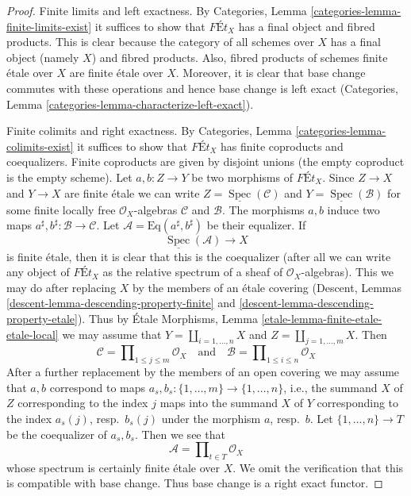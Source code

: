\documentclass{stacks-project}
\theoremstyle{plain}
\theoremstyle{definition}
\theoremstyle{remark}
\numberwithin{equation}{subsection}
\def\Spec{\mathop{\mathrm{Spec}}}
\begin{document}
\begin{proof}
Finite limits and left exactness. By
Categories, Lemma \ref{categories-lemma-finite-limits-exist}
it suffices to show that $\textit{F\'Et}_X$ has a final object
and fibred products. This is clear because the category of
all schemes over $X$ has a final object (namely $X$) and fibred products.
Also, fibred products of schemes finite \'etale over $X$ are
finite \'etale over $X$. Moreover, it is clear that base
change commutes with these operations and hence base change
is left exact (Categories, Lemma
\ref{categories-lemma-characterize-left-exact}).

\medskip\noindent
Finite colimits and right exactness. By
Categories, Lemma \ref{categories-lemma-colimits-exist}
it suffices to show that $\textit{F\'Et}_X$ has finite
coproducts and coequalizers. Finite coproducts are given
by disjoint unions (the empty coproduct is the empty scheme).
Let $a, b : Z \to Y$ be two morphisms of $\textit{F\'Et}_X$.
Since $Z \to X$ and $Y \to X$ are finite \'etale we can write
$Z = \underline{\Spec}(\mathcal{C})$ and $Y = \underline{\Spec}(\mathcal{B})$
for some finite locally free $\mathcal{O}_X$-algebras $\mathcal{C}$
and $\mathcal{B}$. The morphisms $a, b$ induce two maps
$a^\sharp, b^\sharp : \mathcal{B} \to \mathcal{C}$.
Let $\mathcal{A} = \text{Eq}(a^\sharp, b^\sharp)$ be their
equalizer. If
$$
\underline{\Spec}(\mathcal{A}) \longrightarrow X
$$
is finite \'etale, then it is clear that this is the coequalizer
(after all we can write any object of $\textit{F\'Et}_X$
as the relative spectrum of a sheaf of $\mathcal{O}_X$-algebras).
This we may do after replacing $X$ by the members of an \'etale
covering (Descent, Lemmas \ref{descent-lemma-descending-property-finite}
and \ref{descent-lemma-descending-property-etale}).
Thus by \'Etale Morphisms, Lemma \ref{etale-lemma-finite-etale-etale-local}
we may assume that
$Y = \coprod_{i = 1, \ldots, n} X$ and $Z = \coprod_{j = 1, \ldots, m} X$.
Then
$$
\mathcal{C} = \prod\nolimits_{1 \leq j \leq m} \mathcal{O}_X
\quad\text{and}\quad
\mathcal{B} = \prod\nolimits_{1 \leq i \leq n} \mathcal{O}_X
$$
After a further replacement by the members of an open covering
we may assume that $a, b$ correspond to
maps $a_s, b_s : \{1, \ldots, m\} \to \{1, \ldots, n\}$, i.e.,
the summand $X$ of $Z$ corresponding to the index $j$ maps into
the summand $X$ of $Y$ corresponding to the index $a_s(j)$, resp.\ $b_s(j)$
under the morphism $a$, resp.\ $b$.
Let $\{1, \ldots, n\} \to T$ be the coequalizer of $a_s, b_s$.
Then we see that
$$
\mathcal{A} = \prod\nolimits_{t \in T} \mathcal{O}_X
$$
whose spectrum is certainly finite \'etale over $X$. We
omit the verification that this is compatible with base change.
Thus base change is a right exact functor.
\end{proof}
\end{document}
